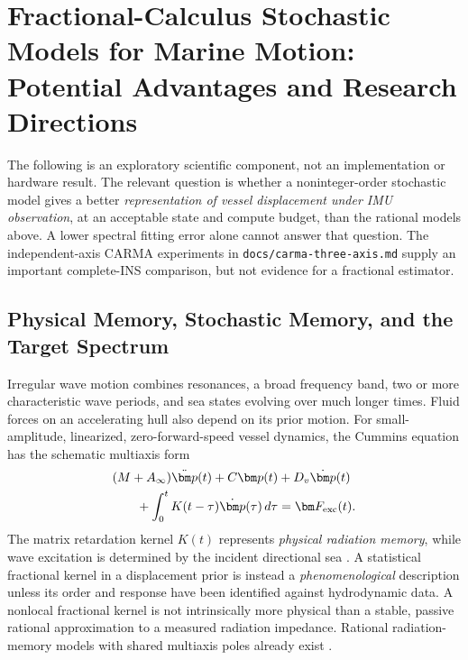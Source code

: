 \section{Fractional-Calculus Stochastic Models for Marine Motion:
Potential Advantages and Research Directions}
\label{sec:fractional}

The following is an exploratory scientific component, not an
implementation or hardware result. The relevant question is whether a
noninteger-order stochastic model gives a better \emph{representation of
vessel displacement under IMU observation}, at an acceptable state and
compute budget, than the rational models above. A lower spectral fitting
error alone cannot answer that question. The independent-axis CARMA
experiments in \texttt{docs/carma-three-axis.md} supply an important
complete-INS comparison, but not evidence for a fractional estimator.

\subsection{Physical Memory, Stochastic Memory, and the Target Spectrum}
\label{sec:frac-motivation}
Irregular wave motion combines resonances, a broad frequency band, two or
more characteristic wave periods, and sea states evolving over much longer
times. Fluid forces on an accelerating hull also depend on its prior motion.
For small-amplitude, linearized, zero-forward-speed vessel dynamics, the
Cummins equation has the schematic multiaxis form
\begin{equation}
\begin{aligned}
(M+A_\infty)\ddot{\bm p}(t)+C\bm p(t)
&+D_v\dot{\bm p}(t)\\
{}+\int_0^t K(t-\tau)\dot{\bm p}(\tau)\,d\tau
&=\bm F_{\rm exc}(t).
\end{aligned}
\label{eq:frac-cummins}
\end{equation}
The matrix retardation kernel \(K(t)\) represents \emph{physical radiation
memory}, while wave excitation is determined by the incident directional
sea \cite{cummins62,perezfossen08,kaasen20}. A statistical fractional kernel
in a displacement prior is instead a \emph{phenomenological} description
unless its order and response have been identified against hydrodynamic
data. A nonlocal fractional kernel is not intrinsically more physical
than a stable, passive rational approximation to a measured radiation
impedance. Rational radiation-memory models with shared multiaxis poles
already exist \cite{perezfossen08,kaasen20}.

